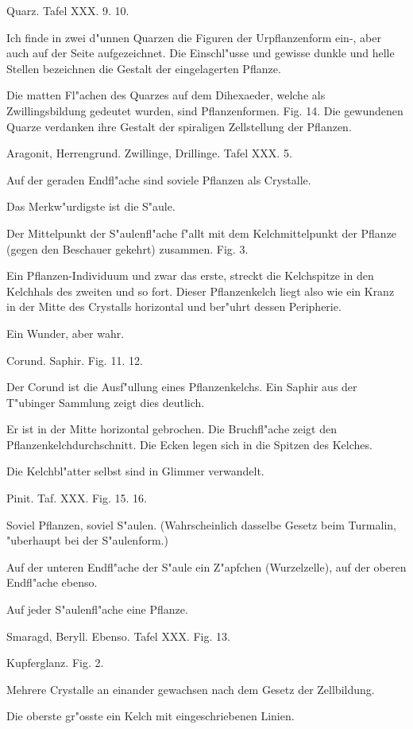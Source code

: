 \documentclass[a4paper, 11pt, oneside, german]{article}
\begin{document}
Quarz. Tafel XXX. 9. 10.

Ich finde in zwei d"unnen Quarzen die Figuren der Urpflanzenform ein-, aber auch auf der Seite aufgezeichnet. Die Einschl"usse und gewisse dunkle und helle Stellen bezeichnen die Gestalt der eingelagerten Pflanze.

Die matten Fl"achen des Quarzes auf dem Dihexaeder, welche als Zwillingsbildung gedeutet wurden, sind Pflanzenformen. Fig. 14. Die gewundenen Quarze verdanken ihre Gestalt der spiraligen Zellstellung der Pflanzen.

Aragonit, Herrengrund. Zwillinge, Drillinge. Tafel XXX. 5.

Auf der geraden Endfl"ache sind soviele Pflanzen als Crystalle.

Das Merkw"urdigste ist die S"aule.

Der Mittelpunkt der S"aulenfl"ache f"allt mit dem Kelchmittelpunkt der Pflanze (gegen den Beschauer gekehrt) zusammen. Fig. 3.

Ein Pflanzen-Individuum und zwar das erste, streckt die Kelchspitze in den Kelchhals des zweiten und so fort. Dieser Pflanzenkelch liegt also wie ein Kranz in der Mitte des Crystalls horizontal und ber"uhrt dessen Peripherie.

Ein Wunder, aber wahr.

Corund. Saphir. Fig. 11. 12.

Der Corund ist die Ausf"ullung eines Pflanzenkelchs. Ein Saphir aus der T"ubinger Sammlung zeigt dies deutlich.

Er ist in der Mitte horizontal gebrochen. Die Bruchfl"ache zeigt den Pflanzenkelchdurchschnitt. Die Ecken legen sich in die Spitzen des Kelches.

Die Kelchbl"atter selbst sind in Glimmer verwandelt.

Pinit. Taf. XXX. Fig. 15. 16.

Soviel Pflanzen, soviel S"aulen. (Wahrscheinlich dasselbe Gesetz beim Turmalin, "uberhaupt bei der S"aulenform.)

Auf der unteren Endfl"ache der S"aule ein Z"apfchen (Wurzelzelle), auf der oberen Endfl"ache ebenso.

Auf jeder S"aulenfl"ache eine Pflanze.

Smaragd, Beryll. Ebenso. Tafel XXX. Fig. 13.

Kupferglanz. Fig. 2.

Mehrere Crystalle an einander gewachsen nach dem Gesetz der Zellbildung.

Die oberste gr"osste ein Kelch mit eingeschriebenen Linien.
\end{document}
